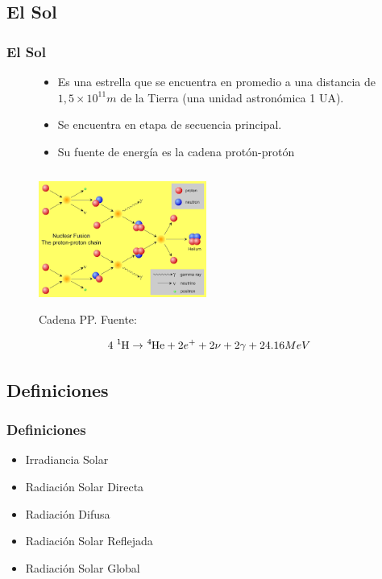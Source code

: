 \documentclass{beamer}
\begin{document}
\subsection{El Sol}
\begin{frame}
  \frametitle{El Sol}
  \begin{figure}[h!]
  \begin{minipage}{0.4\textwidth}
  \begin{flushleft}

  \begin{itemize}
      \item\scriptsize Es una estrella que se encuentra en promedio a una distancia de $1,5 \times 10^{11} m$ de la Tierra (una unidad astronómica 1 UA).
      \item\scriptsize Se encuentra en etapa de secuencia principal.
      \item\scriptsize Su fuente de energía es la cadena protón-protón
  \end{itemize}
  \end{flushleft}
  \end{minipage}
  \hspace{1cm}
  \begin{minipage}{0.4\textwidth}
     \includegraphics[width=5.5cm, height=4.5cm]{cadena_pp}
     \caption{\tiny Cadena PP. Fuente: }
  \end{minipage}
  \end{figure}
  \begin{equation} 4\; \ce{^{1}H} \to \ce{^{4}He} + 2 e^{+} + 2 \nu + 2 \gamma + 24.16 MeV \end{equation}
\end{frame}


\subsection{Definiciones}
\begin{frame}
   \frametitle{Definiciones}
   \begin{itemize}
      \item Irradiancia Solar
      \item Radiación Solar Directa
      \item Radiación Difusa
      \item Radiación Solar Reflejada
      \item Radiación Solar Global
   \end{itemize}
\end{frame}
\end{document}
